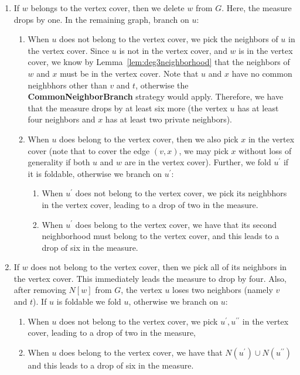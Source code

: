 \documentclass[svgnames]{llncs}
\begin{document}
{\begin{enumerate}[resume=main,label=\bfseries Case~\arabic*:]
\begin{enumdescript}
\begin{enumerate}
\item If $w$ belongs to the vertex cover, then we delete $w$ from $G$. Here, the measure drops by one. In the remaining graph, branch on $u$:
\begin{enumerate}
\item When $u$ does not belong to the vertex cover, we pick the neighbors of $u$ in the vertex cover. Since $u$ is not in the vertex cover, and $w$ is in the vertex cover, we know by 
Lemma~\ref{lem:deg3neighborhood} that the neighbors of $w$ and $x$ must be in the vertex cover. Note that $u$ and $x$ have no common neighbhors other than $v$ and $t$, otherwise the {\bf CommonNeighborBranch} strategy
would apply. Therefore, we have that the measure drops by at least six more (the vertex $u$ has at least four neighbors and $x$ has at least two private neighbors). 
\item When $u$ does belong to the vertex cover, then we also pick $x$ in the vertex cover (note that to cover the edge $(v,x)$, we may pick $x$ without loss of generality if both $u$ and $w$ are in
the vertex cover). Further, we fold $u^\prime$ if it is foldable, otherwise we branch on $u^\prime$:
\begin{enumerate}
\item When $u^\prime$ does not belong to the vertex cover, we pick its neighbhors in the vertex cover, leading to a drop of two in the measure.
\item When $u^\prime$ does belong to the vertex cover, we have that its second neighborhood must belong to the vertex cover, and this leads to a drop of six in the measure.
\end{enumerate} 
\end{enumerate}    
\item If $w$ does not belong to the vertex cover, then we pick all of its neighbors in the vertex cover. This immediately leads the measure to drop by four. Also, after removing $N[w]$ from $G$, the vertex $u$ loses
two neighbors (namely $v$ and $t$). If $u$ is foldable we fold $u$, otherwise we branch on $u$:
\begin{enumerate}  
\item When $u$ does not belong to the vertex cover, we pick $u^\prime,u^{\prime\prime}$ in the vertex cover, leading to a drop of two in the measure,
\item When $u$ does belong to the vertex cover, we have that $N(u^\prime) \cup N(u^{\prime\prime})$ and this leads to a drop of six in the measure. 
\end{enumerate}
\end{enumerate}



\end{enumdescript}
\end{enumerate}}
\end{document}
